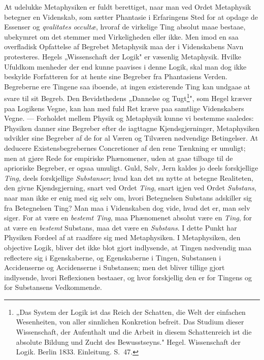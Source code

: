 \documentclass[12pt]{article}
\newcommand{\opage}[1]{\marginnote{\footnotesize\textit{[#1]}}}
\begin{document}
At udelukke Metaphysiken er fuldt berettiget, naar man
ved Ordet Metaphysik betegner en Videnskab, som sætter
Phantasie i Erfaringens Sted for at opdage de Essenser og
\textit{qvalitates occultæ}, hvoraf de virkelige Ting absolut maae bestaae,
ubekymret om det stemmer med Virkeligheden eller ikke. Men
imod en saa overfladisk Opfattelse af Begrebet Metaphysik
maa der i Videnskabens Navn protesteres. Hegels „Wissen\-schaft
der Logik" er væsenlig Metaphysik. Hvilke Ufuldkom\-%
\opage{29}menheder der end kunne paavises i denne Logik, skal man dog
ikke beskylde Forfatteren for at hente sine Begreber fra
Phantasiens Verden. Begreberne ere Tingene saa iboende, at ingen
existerende Ting kan undgaae at svare til sit Begreb. Den
Bevidsthedens „Dannelse og Tugt\footnote{„Das System der Logik ist das
Reich der Schatten, die Welt der einfachen Wesenheiten, von aller sinnlichen
Konkretion befreit. Das Studium dieser Wissenschaft, der Aufenthalt und die
Arbeit in diesem Schattenreich ist die absolute Bildung und Zucht des
Bewusstseyns." Hegel. Wissenschaft der Logik. Berlin 1833. Einleitung.
S.\ 47.}", som Hegel kræver paa
Logikens Vegne, kan han med fuld Ret kræve paa samtlige
Videnskabers Vegne. --- Forholdet mellem Physik og Metaphysik
kunne vi bestemme saaledes: Physiken danner sine Begreber efter
de iagttagne Kjendsgjerninger, Metaphysiken udvikler sine
Begreber af de for al Væren og Tilværen nødvendige Betingelser.
At deducere Existensbegrebernes Concretioner af den rene
Tænkning er umuligt; men at gjøre Rede for empiriske Phænomener,
uden at gaae tilbage til de aprioriske Begreber, er ogsaa
umuligt. Guld, Sølv, Jern kaldes jo deels forskjellige \emph{Ting}, deels
forskjellige \emph{Substanser}; hvad kan det nu nytte at betegne
Realiteten, den givne Kjendsgjerning, snart ved Ordet \emph{Ting},
snart igjen ved Ordet \emph{Substans}, naar man ikke er enig med
sig selv om, hvori Betegnelsen Substans adskiller sig fra
Betegnelsen Ting? Man maa i Videnskaben dog vide, hvad det
er, man selv siger. For at være en \emph{bestemt Ting}, maa
Phænomenet absolut være en \emph{Ting}, for at være en \emph{bestemt}
Substans, maa det være en \emph{Substans}. I dette Punkt har Physiken
Fordeel af at raadføre sig med Metaphysiken. I Metaphysiken,
den objective Logik, bliver det ikke blot gjort indlysende, at
Tingen nødvendig maa reflectere sig i Egenskaberne, og
Egenskaberne i Tingen, Substansen i Accidenserne og Accidenserne
i Substansen; men det bliver tillige gjort indlysende, hvori
Reflexionen bestaaer, og hvor forskjellig den er for Tingens og
for Substansens Vedkommende.
\end{document}
